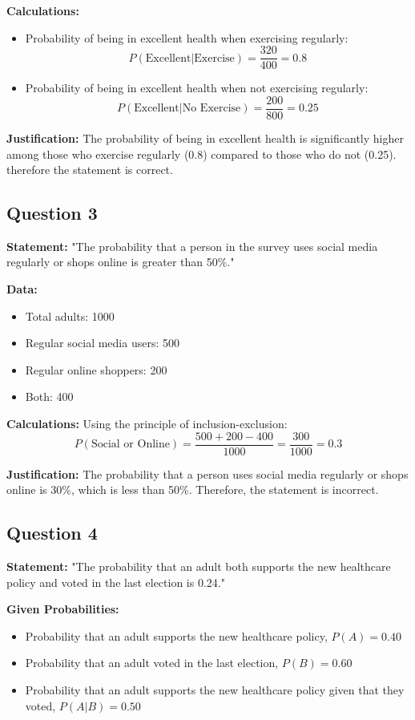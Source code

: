 \documentclass{article}
\begin{document}
\textbf{Calculations:}
\begin{itemize}
    \item Probability of being in excellent health when exercising regularly:
    \[
    P(\text{Excellent} | \text{Exercise}) = \frac{320}{400} = 0.8
    \]
    \item Probability of being in excellent health when not exercising regularly:
    \[
    P(\text{Excellent} | \text{No Exercise}) = \frac{200}{800} = 0.25
    \]
\end{itemize}

\textbf{Justification:}
The probability of being in excellent health is significantly higher among those who exercise regularly (0.8) compared to those who do not (0.25). therefore the statement is correct.

\subsection*{Question 3}
\textbf{Statement:} "The probability that a person in the survey uses social media regularly or shops online is greater than 50\%."

\textbf{Data:}
\begin{itemize}
    \item Total adults: 1000
    \item Regular social media users: 500
    \item Regular online shoppers: 200
    \item Both: 400
\end{itemize}

\textbf{Calculations:}
Using the principle of inclusion-exclusion:
\[
P(\text{Social or Online}) = \frac{500 + 200 - 400}{1000} = \frac{300}{1000} = 0.3
\]

\textbf{Justification:}
The probability that a person uses social media regularly or shops online is 30\%, which is less than 50\%. Therefore, the statement is incorrect.

\subsection*{Question 4}
\textbf{Statement:} "The probability that an adult both supports the new healthcare policy and voted in the last election is 0.24."

\textbf{Given Probabilities:}
\begin{itemize}
    \item Probability that an adult supports the new healthcare policy, \( P(A) = 0.40 \)
    \item Probability that an adult voted in the last election, \( P(B) = 0.60 \)
    \item Probability that an adult supports the new healthcare policy given that they voted, \( P(A|B) = 0.50 \)
\end{itemize}
\end{document}
